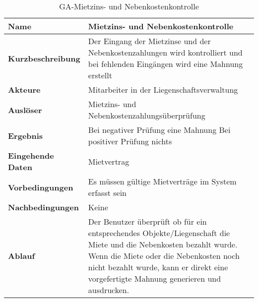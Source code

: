 \begin{table}[H]
  \centering
  \settowidth{}
  \setlength\extrarowheight{2pt}
  \begin{tabulary}{1.0\textwidth}{|a|m{12cm}|}
    \hline
    \textbf{Name}&Mietzins- und Nebenkostenkontrolle\\
    \hline 
    \textbf{Kurzbeschreibung} & Der Eingang der Mietzinse und der Nebenkostenzahlungen wird kontrolliert und bei fehlenden Eingängen wird eine Mahnung erstellt\\
    \hline
    \textbf{Akteure} & Mitarbeiter in der Liegenschaftsverwaltung\\
    \hline
    \textbf{Auslöser} & Mietzins- und Nebenkostenzahlungsüberprüfung\\
    \hline
    \textbf{Ergebnis} & Bei negativer Prüfung eine Mahnung\newline 
    Bei positiver Prüfung nichts\\
    \hline
    \textbf{Eingehende Daten} & Mietvertrag\\
    \hline
    \textbf{Vorbedingungen} & Es müssen gültige Mietverträge im System erfasst sein \\
    \hline
    \textbf{Nachbedingungen} & Keine \\
    \hline
    \textbf{Ablauf} & Der Benutzer überprüft ob für ein entsprechendes Objekte/Liegenschaft die Miete und die Nebenkosten bezahlt wurde. Wenn die Miete oder die Nebenkosten noch nicht bezahlt wurde, kann er direkt eine vorgefertigte Mahnung generieren und ausdrucken.\\
    \hline
  \end{tabulary}
  \caption{GA-Mietzins- und Nebenkostenkontrolle}
\end{table}


